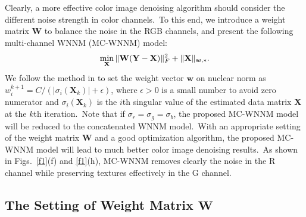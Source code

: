 \documentclass[10pt,twocolumn,letterpaper]{article}
\begin{document}
Clearly, a more effective color image denoising algorithm should consider the different noise strength in color channels.\ To this end, we introduce a weight matrix $\mathbf{W}$ to balance the noise in the RGB channels, and present the following multi-channel WNNM (MC-WNNM) model:
\vspace{-3mm}
\begin{equation}
\label{e4}
\vspace{-3mm}
\min_{\mathbf{X}}\|\mathbf{W}(\mathbf{Y}-\mathbf{X})\|_{F}^{2}
+ 
\|\mathbf{X}\|_{\bm{w},*}.
\end{equation}
We follow the method in \cite{wnnmijcv} to set the weight vector $\bm{w}$ on nuclear norm as $w_{i}^{k+1}=C/(|\sigma_{i}(\mathbf{X}_{k})|+\epsilon)$, where $\epsilon>0$ is a small number to avoid zero numerator and $\sigma_{i}(\mathbf{X}_{k})$ is the $i$th singular value of the estimated data matrix $\mathbf{X}$ at the $k$th iteration.\ Note that if $\sigma_{r}=\sigma_{g}=\sigma_{b}$, the proposed MC-WNNM model will be reduced to the concatenated WNNM model.\ With an appropriate setting of the weight matrix $\mathbf{W}$ and a good optimization algorithm, the proposed MC-WNNM model will lead to much better color image denoising results.\ As shown in Figs.\ \ref{f1}(f) and \ref{f1}(h), MC-WNNM removes clearly the noise in the R channel while preserving textures effectively in the G channel. 

\vspace{-1mm}
\subsection{The Setting of Weight Matrix $\mathbf{W}$}
\vspace{-1mm}
\end{document}
